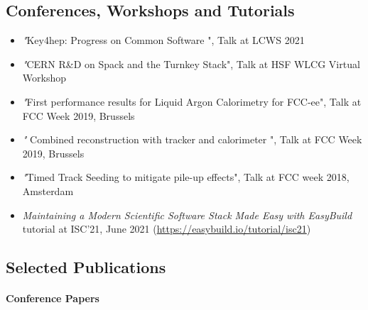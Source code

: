 \subsection*{Conferences, Workshops and Tutorials}

\begin{itemize}


\item {{\emph "Key4hep: Progress on Common Software "}, Talk at { LCWS 2021}}\\
\item {{\emph "CERN R\&D on Spack and the Turnkey Stack"}, Talk at {HSF WLCG Virtual Workshop}}\\
\item {{\emph "First performance results for Liquid Argon Calorimetry for FCC-ee"}, Talk at { FCC Week 2019, Brussels}}\\
\item {{\emph " Combined reconstruction with tracker and calorimeter "}, Talk at { FCC Week 2019, Brussels}}\\
\item {{\emph "Timed Track Seeding to mitigate pile-up effects"}, Talk at FCC week
2018, Amsterdam} \\

\item[] \emph{Maintaining a Modern Scientific Software Stack Made Easy with EasyBuild} tutorial at ISC'21, June 2021 (\url{https://easybuild.io/tutorial/isc21})
\end{itemize}

\subsection*{Selected Publications}

\paragraph{Conference Papers}

